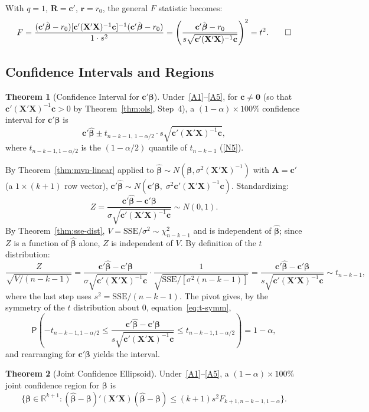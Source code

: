 \documentclass[12pt,a4paper]{article}
\makeatletter
\theoremstyle{definition}
\newtheorem{theorem}{Theorem}[section]
\renewenvironment{proof}[1][\proofname]{\par
  \pushQED{\qed}%
  \normalfont \topsep6\p@\@plus6\p@\relax
  \trivlist
  \item[\hskip\labelsep\bfseries #1\@addpunct{.}]\ignorespaces
}{%
  \popQED\endtrivlist\@endpefalse
}
\newcommand\prb{\mathsf{P}}
\newcommand{\SSE}{\mathrm{SSE}}
\newcommand{\bX}{\mathbf{X}}
\def\bb{\boldsymbol{\beta}}
\newcommand{\bR}{\mathbf{R}}
\newcommand{\br}{\mathbf{r}}
\def\bc{\mathbf{c}}
\newcommand{\bzero}{\mathbf{0}}
\newcommand{\bA}{\mathbf{A}}
\newcommand{\Real}{\mathbb{R}}
\makeatother
\begin{document}
\begin{proof}
With $q = 1$, $\bR = \bc'$, $\br = r_0$, the general $F$ statistic becomes:
\[
F = \frac{(\bc'\hat{\bb} - r_0)[\bc'(\bX'\bX)^{-1}\bc]^{-1}(\bc'\hat{\bb} - r_0)}{1 \cdot s^2} = \left(\frac{\bc'\hat{\bb} - r_0}{s\sqrt{\bc'(\bX'\bX)^{-1}\bc}}\right)^2 = t^2. \qedhere
\]
\end{proof}

\subsection{Confidence Intervals and Regions}

\begin{theorem}[Confidence Interval for $\bc'\bb$]\label{thm:ci}
Under~\ref{A1}--\ref{A5}, for $\bc \neq \bzero$ (so that $\bc'(\bX'\bX)^{-1}\bc > 0$ by Theorem~\ref{thm:ols}, Step~4), a $(1-\alpha) \times 100\%$ confidence interval for $\bc'\bb$ is
\begin{equation}
\bc'\hat{\bb} \pm t_{n-k-1,\,1-\alpha/2} \cdot s\sqrt{\bc'(\bX'\bX)^{-1}\bc},
\end{equation}
where $t_{n-k-1,1-\alpha/2}$ is the $(1-\alpha/2)$ quantile of $t_{n-k-1}$ (\ref{N5}).
\end{theorem}

\begin{proof}
By Theorem~\ref{thm:mvn-linear} applied to $\hat{\bb} \sim N(\bb, \sigma^2(\bX'\bX)^{-1})$ with $\bA = \bc'$ (a $1 \times (k+1)$ row vector), $\bc'\hat{\bb} \sim N(\bc'\bb,\; \sigma^2\bc'(\bX'\bX)^{-1}\bc)$. Standardizing:
\[
Z = \frac{\bc'\hat{\bb} - \bc'\bb}{\sigma\sqrt{\bc'(\bX'\bX)^{-1}\bc}} \sim N(0, 1).
\]
By Theorem~\ref{thm:sse-dist}, $V = \SSE/\sigma^2 \sim \chi^2_{n-k-1}$ and is independent of $\hat{\bb}$; since $Z$ is a function of $\hat{\bb}$ alone, $Z$ is independent of $V$. By definition of the $t$ distribution:
\[
\frac{Z}{\sqrt{V/(n-k-1)}} = \frac{\bc'\hat{\bb} - \bc'\bb}{\sigma\sqrt{\bc'(\bX'\bX)^{-1}\bc}} \cdot \frac{1}{\sqrt{\SSE/[\sigma^2(n-k-1)]}} = \frac{\bc'\hat{\bb} - \bc'\bb}{s\sqrt{\bc'(\bX'\bX)^{-1}\bc}} \sim t_{n-k-1},
\]
where the last step uses $s^2 = \SSE/(n-k-1)$. The pivot gives, by the symmetry of the $t$ distribution about $0$, equation~\eqref{eq:t-symm},
\[
\prb\!\left(-t_{n-k-1,1-\alpha/2} \leqslant \frac{\bc'\hat{\bb} - \bc'\bb}{s\sqrt{\bc'(\bX'\bX)^{-1}\bc}} \leqslant t_{n-k-1,1-\alpha/2}\right) = 1 - \alpha,
\]
and rearranging for $\bc'\bb$ yields the interval.
\end{proof}

\begin{theorem}[Joint Confidence Ellipsoid]\label{thm:ellipsoid}
Under~\ref{A1}--\ref{A5}, a $(1-\alpha) \times 100\%$ joint confidence region for $\bb$ is
\begin{equation}
\bigl\{\bb \in \Real^{k+1} : (\hat{\bb} - \bb)'(\bX'\bX)(\hat{\bb} - \bb) \leqslant (k+1) s^2 F_{k+1, n-k-1, 1-\alpha}\bigr\}.
\end{equation}
\end{theorem}
\end{document}
